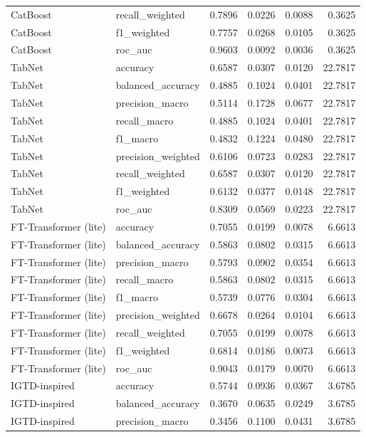 \begin{tabular}{llrrrr}
CatBoost & recall_weighted & 0.7896 & 0.0226 & 0.0088 & 0.3625 \\
CatBoost & f1_weighted & 0.7757 & 0.0268 & 0.0105 & 0.3625 \\
CatBoost & roc_auc & 0.9603 & 0.0092 & 0.0036 & 0.3625 \\
TabNet & accuracy & 0.6587 & 0.0307 & 0.0120 & 22.7817 \\
TabNet & balanced_accuracy & 0.4885 & 0.1024 & 0.0401 & 22.7817 \\
TabNet & precision_macro & 0.5114 & 0.1728 & 0.0677 & 22.7817 \\
TabNet & recall_macro & 0.4885 & 0.1024 & 0.0401 & 22.7817 \\
TabNet & f1_macro & 0.4832 & 0.1224 & 0.0480 & 22.7817 \\
TabNet & precision_weighted & 0.6106 & 0.0723 & 0.0283 & 22.7817 \\
TabNet & recall_weighted & 0.6587 & 0.0307 & 0.0120 & 22.7817 \\
TabNet & f1_weighted & 0.6132 & 0.0377 & 0.0148 & 22.7817 \\
TabNet & roc_auc & 0.8309 & 0.0569 & 0.0223 & 22.7817 \\
FT-Transformer (lite) & accuracy & 0.7055 & 0.0199 & 0.0078 & 6.6613 \\
FT-Transformer (lite) & balanced_accuracy & 0.5863 & 0.0802 & 0.0315 & 6.6613 \\
FT-Transformer (lite) & precision_macro & 0.5793 & 0.0902 & 0.0354 & 6.6613 \\
FT-Transformer (lite) & recall_macro & 0.5863 & 0.0802 & 0.0315 & 6.6613 \\
FT-Transformer (lite) & f1_macro & 0.5739 & 0.0776 & 0.0304 & 6.6613 \\
FT-Transformer (lite) & precision_weighted & 0.6678 & 0.0264 & 0.0104 & 6.6613 \\
FT-Transformer (lite) & recall_weighted & 0.7055 & 0.0199 & 0.0078 & 6.6613 \\
FT-Transformer (lite) & f1_weighted & 0.6814 & 0.0186 & 0.0073 & 6.6613 \\
FT-Transformer (lite) & roc_auc & 0.9043 & 0.0179 & 0.0070 & 6.6613 \\
IGTD-inspired & accuracy & 0.5744 & 0.0936 & 0.0367 & 3.6785 \\
IGTD-inspired & balanced_accuracy & 0.3670 & 0.0635 & 0.0249 & 3.6785 \\
IGTD-inspired & precision_macro & 0.3456 & 0.1100 & 0.0431 & 3.6785 \\

\end{tabular}
